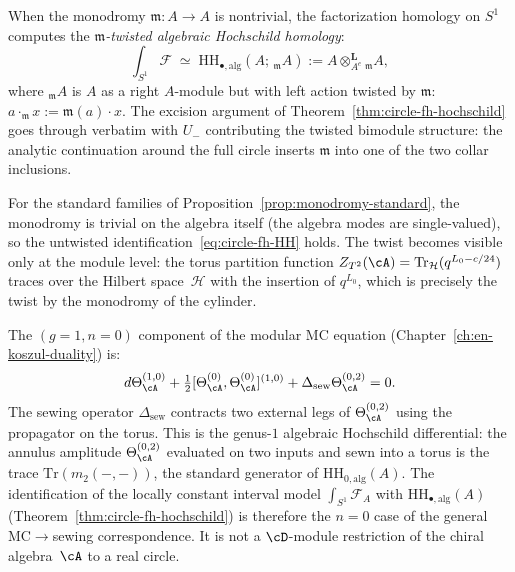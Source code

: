 \begin{remark}
\label{rem:twisted-hochschild}
When the monodromy $\mathfrak{m}\colon A \to A$ is nontrivial, the
factorization homology on $S^1$ computes the
\emph{$\mathfrak{m}$-twisted algebraic Hochschild homology}:
\begin{equation}\label{eq:twisted-HH}
\int_{S^1} \mathcal{F}
\;\simeq\;
\mathrm{HH}_{\bullet,\mathrm{alg}}(A;\, {}_{\mathfrak{m}}A)
:= A \otimes^{\mathbf{L}}_{A^e} {}_{\mathfrak{m}}A,
\end{equation}
where ${}_{\mathfrak{m}}A$ is $A$ as a right $A$-module but with
left action twisted by $\mathfrak{m}$: $a \cdot_{\mathfrak{m}} x :=
\mathfrak{m}(a) \cdot x$. The excision argument of
Theorem~\ref{thm:circle-fh-hochschild} goes through verbatim with
$U_-$ contributing the twisted bimodule structure: the analytic
continuation around the full circle inserts $\mathfrak{m}$ into one
of the two collar inclusions.

For the standard families of
Proposition~\ref{prop:monodromy-standard}, the monodromy is trivial
on the algebra itself (the algebra modes are single-valued), so the
untwisted identification~\eqref{eq:circle-fh-HH} holds. The twist
becomes visible only at the module level: the torus partition function
$Z_{T^2}(\cA) = \mathrm{Tr}_{\mathcal{H}}(q^{L_0 - c/24})$ traces
over the Hilbert space~$\mathcal{H}$ with the insertion of
$q^{L_0}$, which is precisely the twist by the monodromy of the
cylinder.
\end{remark}

\begin{remark}[The $(g{=}1, k{=}0)$ modular MC component]
\label{rem:mc-hh-identification}
The $(g=1, n=0)$ component of the modular MC equation
(Chapter~\ref{ch:en-koszul-duality}) is:
\[
d\Theta_{\cA}^{(1,0)} + \tfrac{1}{2}
 [\Theta_{\cA}^{(0)}, \Theta_{\cA}^{(0)}]^{(1,0)}
 + \Delta_{\mathrm{sew}}\Theta_{\cA}^{(0,2)} = 0.
\]
The sewing operator $\Delta_{\mathrm{sew}}$ contracts two external
legs of $\Theta^{(0,2)}_{\cA}$ using the propagator on the torus.
This is the genus-$1$ algebraic Hochschild differential: the annulus
amplitude $\Theta^{(0,2)}_{\cA}$ evaluated on two inputs and sewn
into a torus is the trace $\mathrm{Tr}(m_2(-,-))$, the standard
generator of $\mathrm{HH}_{0,\mathrm{alg}}(A)$. The identification
of the locally constant interval model
$\int_{S^1}\mathcal F_A$ with
$\mathrm{HH}_{\bullet,\mathrm{alg}}(A)$
(Theorem~\ref{thm:circle-fh-hochschild})
is therefore the $n=0$ case of the general MC$\to$sewing
correspondence. It is not a $\cD$-module restriction of the chiral
algebra~$\cA$ to a real circle.
\end{remark}

